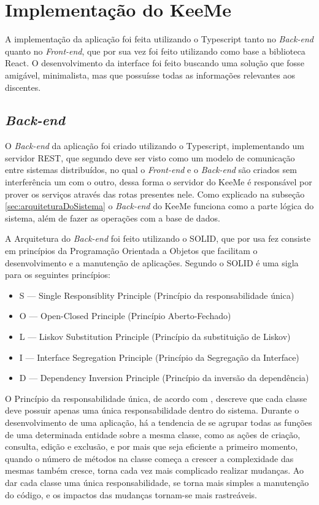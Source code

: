 \section{Implementação do KeeMe}
\label{sec:implementacao}

A implementação da aplicação foi feita utilizando o Typescript tanto no \textit{Back-end} quanto no \textit{Front-end}, que por sua vez foi feito utilizando como base a biblioteca React. O desenvolvimento da interface foi feito buscando uma solução que fosse amigável, minimalista, mas que possuísse todas as informações relevantes aos discentes.

\subsection{\textit{Back-end}}

O \textit{Back-end} da aplicação foi criado utilizando o Typescript, implementando um servidor REST, que segundo \cite{costa2020__rest} deve ser visto como um modelo de comunicação entre sistemas distribuídos, no qual o \textit{Front-end} e o \textit{Back-end} são criados sem interferência um com o outro, dessa forma o servidor do KeeMe é responsável por prover os serviços através das rotas presentes nele. Como explicado na subseção \ref{sec:arquiteturaDoSistema} o \textit{Back-end} do KeeMe funciona como a parte lógica do sistema, além de fazer as operações com a base de dados.

A Arquitetura do \textit{Back-end} foi feito utilizando o SOLID, que por usa fez consiste em princípios da Programação Orientada a Objetos que facilitam o desenvolvimento e a manutenção de aplicações. Segundo \cite{paixao2020__solid} o SOLID é uma sigla para os seguintes princípios: 

\begin{itemize}
    \item S — Single Responsiblity Principle (Princípio da responsabilidade única)
    \item O — Open-Closed Principle (Princípio Aberto-Fechado)
    \item L — Liskov Substitution Principle (Princípio da substituição de Liskov)
    \item I — Interface Segregation Principle (Princípio da Segregação da Interface)
    \item D — Dependency Inversion Principle (Princípio da inversão da dependência)
\end{itemize}

O Princípio da responsabilidade única, de acordo com \cite{paixao2020__solid}, descreve que cada classe deve possuir apenas uma única responsabilidade dentro do sistema. Durante o desenvolvimento de uma aplicação, há a tendencia de se agrupar todas as funções de uma determinada entidade sobre a mesma classe, como as ações de criação, consulta, edição e exclusão, e por mais que seja eficiente a primeiro momento, quando o número de métodos na classe começa a crescer a complexidade das mesmas também cresce, torna cada vez mais complicado realizar mudanças. Ao dar cada classe uma única responsabilidade, se torna mais simples a manutenção do código, e os impactos das mudanças tornam-se mais rastreáveis.

